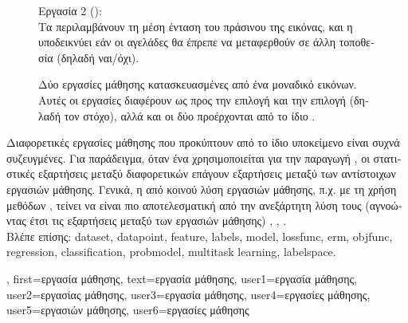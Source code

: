 {{\begin{figure}[H]
			\hfill
			\begin{minipage}[t]{0.45\textwidth}
    			\foreignlanguage{greek}{Εργασία} 2 (): \\
			\foreignlanguage{greek}{Τα}  \foreignlanguage{greek}{περιλαμβάνουν τη μέση ένταση του πράσινου της εικόνας, 
			και η}  \foreignlanguage{greek}{υποδεικνύει εάν οι αγελάδες θα έπρεπε να μεταφερθούν σε άλλη τοποθεσία 
			(δηλαδή ναι/όχι}).
			\end{minipage}
		{
		\caption{\foreignlanguage{greek}{Δύο εργασίες μάθησης κατασκευασμένες από ένα μοναδικό}  
			\foreignlanguage{greek}{εικόνων. Αυτές οι εργασίες διαφέρουν ως προς την επιλογή}  \foreignlanguage{greek}{και 
			την επιλογή}  (\foreignlanguage{greek}{δηλαδή τον στόχο), αλλά και οι δύο προέρχονται από το ίδιο} 
			.} 
			\label{fig:learning_tasks_cows_dict} }
		\end{figure}
		\foreignlanguage{greek}{Διαφορετικές εργασίες μάθησης που προκύπτουν από το ίδιο υποκείμενο}  
		\foreignlanguage{greek}{είναι συχνά συζευγμένες. Για παράδειγμα, όταν ένα}  \foreignlanguage{greek}{χρησιμοποιείται 
		για την παραγωγή} , \foreignlanguage{greek}{οι στατιστικές εξαρτήσεις μεταξύ διαφορετικών}  
		\foreignlanguage{greek}{επάγουν εξαρτήσεις μεταξύ των αντίστοιχων εργασιών μάθησης. Γενικά, η από κοινού λύση εργασιών μάθησης, 
		π.χ. με τη χρήση μεθόδων} , \foreignlanguage{greek}{τείνει να είναι πιο αποτελεσματική από την ανεξάρτητη 
		λύση τους (αγνοώντας έτσι τις εξαρτήσεις μεταξύ των εργασιών μάθησης)}
		\cite{Caruana:1997wk}, \cite{JungGaphLassoSPL}, \cite{CSGraphSelJournal}.
	 			\\ 
		\foreignlanguage{greek}{Βλέπε επίσης:} \gls{dataset}, \gls{datapoint}, \gls{feature}, \glspl{label}, \gls{model}, \gls{lossfunc}, \gls{erm}, \gls{objfunc}, 
		\gls{regression}, \gls{classification}, \gls{probmodel}, \gls{multitask learning}, \gls{labelspace}. },
	first={\foreignlanguage{greek}{εργασία μάθησης}},
	text={\foreignlanguage{greek}{εργασία μάθησης}},
	user1={\foreignlanguage{greek}{εργασία μάθησης}}, %
	user2={\foreignlanguage{greek}{εργασίας μάθησης}}, %
	user3={\foreignlanguage{greek}{εργασία μάθησης}}, %
	user4={\foreignlanguage{greek}{εργασίες μάθησης}}, %
	user5={\foreignlanguage{greek}{εργασιών μάθησης}}, %
	user6={\foreignlanguage{greek}{εργασίες μάθησης}} %
}

